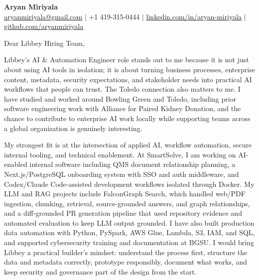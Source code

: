 \documentclass[11pt]{letter}
\begin{document}
\begin{center}
{\Large \textbf{Aryan Miriyala}}\\
\href{mailto:aryanmiriyala@gmail.com}{aryanmiriyala@gmail.com} $|$ +1 419-315-0444 $|$
\href{https://www.linkedin.com/in/aryan-miriyala-7788a21b6/}{linkedin.com/in/aryan-miriyala} $|$
\href{https://github.com/aryanmiriyala}{github.com/aryanmiriyala}
\end{center}

\vspace{0.15in}

Dear Libbey Hiring Team,

Libbey's AI \& Automation Engineer role stands out to me because it is not just about using AI tools in isolation; it is about turning business processes, enterprise content, metadata, security expectations, and stakeholder needs into practical AI workflows that people can trust. The Toledo connection also matters to me. I have studied and worked around Bowling Green and Toledo, including prior software engineering work with Alliance for Paired Kidney Donation, and the chance to contribute to enterprise AI work locally while supporting teams across a global organization is genuinely interesting.

My strongest fit is at the intersection of applied AI, workflow automation, secure internal tooling, and technical enablement. At SmartSolve, I am working on AI-enabled internal software including QMS document relationship planning, a Next.js/PostgreSQL onboarding system with SSO and auth middleware, and Codex/Claude Code-assisted development workflows isolated through Docker. My LLM and RAG projects include FalconGraph Search, which handled web/PDF ingestion, chunking, retrieval, source-grounded answers, and graph relationships, and a diff-grounded PR generation pipeline that used repository evidence and automated evaluation to keep LLM output grounded. I have also built production data automation with Python, PySpark, AWS Glue, Lambda, S3, IAM, and SQL, and supported cybersecurity training and documentation at BGSU. I would bring Libbey a practical builder's mindset: understand the process first, structure the data and metadata correctly, prototype responsibly, document what works, and keep security and governance part of the design from the start.
\end{document}
